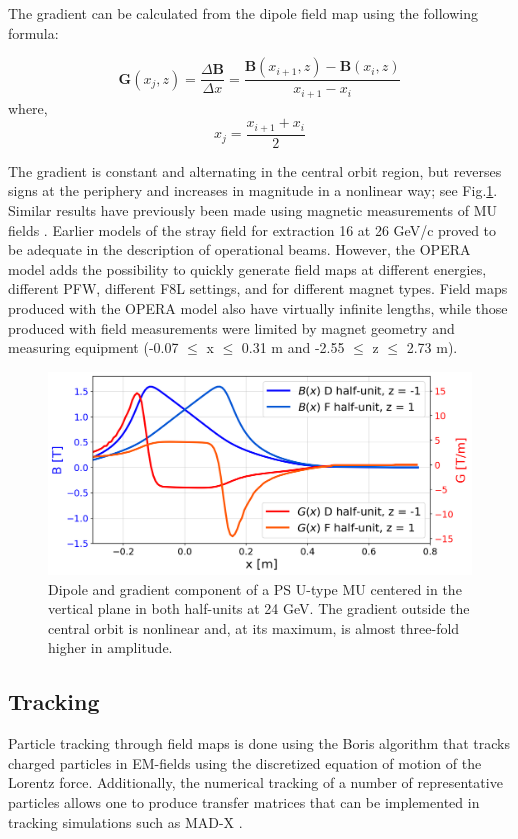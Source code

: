 \documentclass[a4paper,
               biblatex,     %
               keeplastbox,   %
               ]{jacow}
\begin{document}
The gradient can be calculated from the dipole field map using the following formula:
 
$$ \boldsymbol{G}(x_{j},z) = \frac{\Delta\boldsymbol{B}}{\Delta x} = \frac{\boldsymbol{B}(x_{i+1},z) - \boldsymbol{B}(x_{i},z)}{x_{i+1}-x_{i}} $$
where,
$$ x_{j} = \frac{x_{i+1} + x_{i}}{{2}} $$
 
The gradient is constant and alternating in the central orbit region, but reverses signs at the periphery and increases in magnitude in a nonlinear way; see Fig.\ref{fig:gradient_field}. Similar results have previously been made using magnetic measurements of MU fields \cite{manglunki_beam_1997}. Earlier models of the stray field for extraction 16 at 26 GeV/c proved to be adequate in the description of operational beams. However, the OPERA model adds the possibility to quickly generate field maps at different energies, different PFW, different F8L settings, and for different magnet types. Field maps produced with the OPERA model also have virtually infinite lengths, while those produced with field measurements were limited by magnet geometry and measuring equipment (-0.07 $\leq$ x $\leq$ 0.31 m and -2.55 $\leq$ z $\leq$ 2.73 m)\cite{manglunki_beam_1997}.

\begin{figure}[!htb]
   \centering
   \includegraphics*[width=1.0\columnwidth, trim={0 0 0 0cm},clip]{MOPOTK030_f4.png}
   \caption{Dipole and gradient component of a  PS U-type MU centered in the vertical plane in both half-units at 24 GeV. The gradient outside the central orbit is nonlinear and, at its maximum, is almost three-fold higher in amplitude.}
   \label{fig:gradient_field}
\end{figure}

\subsection{Tracking}
Particle tracking through field maps is done using the Boris algorithm that tracks charged particles in EM-fields using the discretized equation of motion of the Lorentz force\cite{qin_why_2013}\cite{ripperda_comprehensive_2018}. Additionally, the numerical tracking of a number of representative particles allows one to produce transfer matrices that can be implemented in tracking simulations such as MAD-X \cite{yoon_method_2013}.
\end{document}
